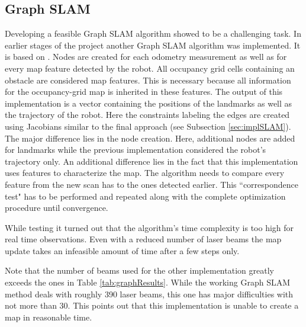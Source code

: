 \documentclass{ba-kecs}
\begin{document}
\subsection{Graph SLAM}
\label{disc:grSlam}
Developing a feasible Graph SLAM algorithm showed to be a challenging task. In earlier stages of the project another Graph SLAM algorithm was implemented.
It is based on \cite{Thrun}. 
Nodes are created for each odometry measurement as well as for every map feature detected by the robot. All occupancy grid cells containing an obstacle are considered map features. This is necessary because all information for the occupancy-grid map is inherited in these features. The output of this implementation is a vector containing the positions of the landmarks as well as the trajectory of the robot. Here the constraints labeling the edges are created using Jacobians similar to the final approach (see Subsection \ref{sec:implSLAM}). The major difference lies in the node creation. Here, additional nodes are added for landmarks while the previous implementation considered the robot's trajectory only. An additional difference lies in the fact that this implementation uses features to characterize the map. The algorithm needs to compare every feature from the new scan has to the ones detected earlier. This ``correspondence test" has to be performed and repeated along with the complete optimization procedure until convergence. 

While testing it turned out that the algorithm's time complexity is too high for real time observations. Even with a reduced number of laser beams the map update takes an infeasible amount of time after a few steps only. 
\begin{table}[h]
\begin{center}
\end{center}
\caption{The time the Graph SLAM implementation proposed by \citep{Thrun} needed using the specified number of laser beams after the specified number of steps.}
\label{tab:graphResults}
\end{table}
Note that the number of beams used for the other implementation greatly exceeds the ones in Table \ref{tab:graphResults}. While the working Graph SLAM method deals with roughly 390 laser beams, this one has major difficulties with not more than 30.
This points out that this implementation is unable to create a map in reasonable time.
\end{document}
